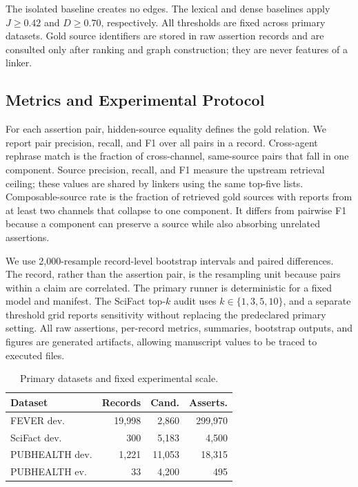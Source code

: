 \documentclass[graybox]{svmult}
\begin{document}
The isolated baseline creates no edges. The lexical and dense baselines apply $J\geq0.42$ and $D\geq0.70$, respectively. All thresholds are fixed across primary datasets. Gold source identifiers are stored in raw assertion records and are consulted only after ranking and graph construction; they are never features of a linker.

\subsection{Metrics and Experimental Protocol}

For each assertion pair, hidden-source equality defines the gold relation. We report pair precision, recall, and F1 over all pairs in a record. Cross-agent rephrase match is the fraction of cross-channel, same-source pairs that fall in one component. Source precision, recall, and F1 measure the upstream retrieval ceiling; these values are shared by linkers using the same top-five lists. Composable-source rate is the fraction of retrieved gold sources with reports from at least two channels that collapse to one component. It differs from pairwise F1 because a component can preserve a source while also absorbing unrelated assertions.

We use 2,000-resample record-level bootstrap intervals and paired differences. The record, rather than the assertion pair, is the resampling unit because pairs within a claim are correlated. The primary runner is deterministic for a fixed model and manifest. The SciFact top-$k$ audit uses $k\in\{1,3,5,10\}$, and a separate threshold grid reports sensitivity without replacing the predeclared primary setting. All raw assertions, per-record metrics, summaries, bootstrap outputs, and figures are generated artifacts, allowing manuscript values to be traced to executed files.

\begin{table}[t]
\centering
\caption{Primary datasets and fixed experimental scale.}
\label{tab:data}
\scriptsize
\setlength{\tabcolsep}{1.5pt}
\begin{tabular}{lrrr}
\toprule
Dataset & Records & Cand. & Asserts.\\
\midrule
FEVER dev. & 19,998 & 2,860 & 299,970\\
SciFact dev. & 300 & 5,183 & 4,500\\
PUBHEALTH dev. & 1,221 & 11,053 & 18,315\\
PUBHEALTH ev. & 33 & 4,200 & 495\\
\bottomrule
\end{tabular}
\end{table}
\end{document}
